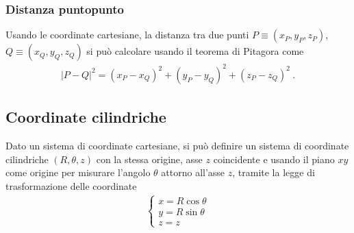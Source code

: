 \documentclass[letterpaper,10pt,italian]{jupyterBook}
\begin{document}
\subsubsection{Distanza punto\sphinxhyphen{}punto}
\label{\detokenize{ch/analytic_geometry/analytic_geometry_3d/points:distanza-punto-punto}}
\sphinxAtStartPar
Usando le coordinate cartesiane, la distanza tra due punti \(P \equiv(x_P, y_P, z_P)\), \(Q \equiv (x_Q, y_Q, z_Q)\) si può calcolare usando il teorema di Pitagora come
\begin{equation*}
\begin{split}|P-Q|^2 = (x_P - x_Q)^2 + (y_P - y_Q)^2 + (z_P - z_Q)^2 \ .\end{split}
\end{equation*}

\subsection{Coordinate cilindriche}
\label{\detokenize{ch/analytic_geometry/analytic_geometry_3d/points:coordinate-cilindriche}}\label{\detokenize{ch/analytic_geometry/analytic_geometry_3d/points:geometry-analytic-3d-coordinates-cylindrical}}
\sphinxAtStartPar
Dato un sistema di coordinate cartesiane, si può definire un sistema di coordinate cilindriche \((R, \theta, z)\) con la stessa origine, asse \(z\) coincidente e usando il piano \(x\)\sphinxhyphen{}\(y\) come origine per misurare l’angolo \(\theta\) attorno all’asse \(z\), tramite la legge di trasformazione delle coordinate
\begin{equation*}
\begin{split}\begin{cases}
x = R \cos \theta \\
y = R \sin \theta \\
z = z
\end{cases}\end{split}
\end{equation*}
\end{document}

